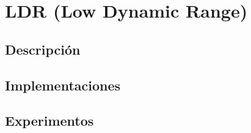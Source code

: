 \section{LDR (Low Dynamic Range)}

\subsection{Descripción}
 \cite{hackersdelight}
\subsection{Implementaciones}

\subsection{Experimentos}

